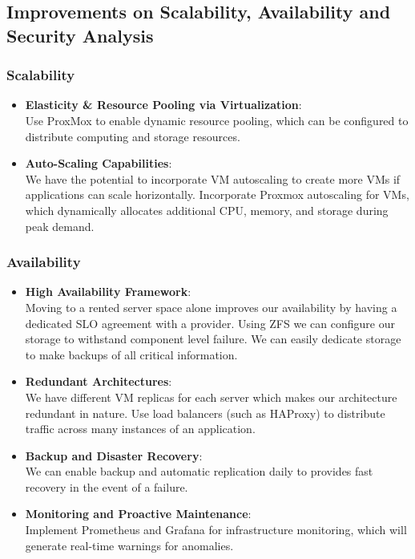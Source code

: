\documentclass{llncs}
\begin{document}
\subsection{Improvements on Scalability, Availability and Security Analysis}

\subsubsection*{Scalability}

\begin{itemize}
  \item \textbf{Elasticity \& Resource Pooling via Virtualization}:
        \\
        Use ProxMox to enable dynamic resource pooling, which can be configured to distribute computing and storage resources.
        \\
  \item \textbf{Auto-Scaling Capabilities}:
        \\ 
        We have the potential to incorporate VM autoscaling to create more VMs if applications can scale horizontally.
        Incorporate Proxmox autoscaling for VMs, which dynamically allocates additional CPU, memory, and storage during peak demand.
        \\    
\end{itemize}

\subsubsection*{Availability}
\begin{itemize}
  \item \textbf{High Availability Framework}:
        \\
        Moving to a rented server space alone improves our availability by having a dedicated SLO agreement with a provider.
        Using ZFS we can configure our storage to withstand component level failure.
        We can easily dedicate storage to make backups of all critical information.
        \\
  \item \textbf{Redundant Architectures}:
        \\ 
        We have different VM replicas for each server which makes our architecture redundant in nature.
        Use load balancers (such as HAProxy) to distribute traffic across many instances of an application.
        \\    
  \item \textbf{Backup and Disaster Recovery}:
        \\ 
        We can enable backup and automatic replication daily to provides fast recovery in the event of a failure.
        \\ 
  \item \textbf{Monitoring and Proactive Maintenance}:
        \\ 
        Implement Prometheus and Grafana for infrastructure monitoring, which will generate real-time warnings for anomalies.
        \\ 
\end{itemize}
\end{document}

